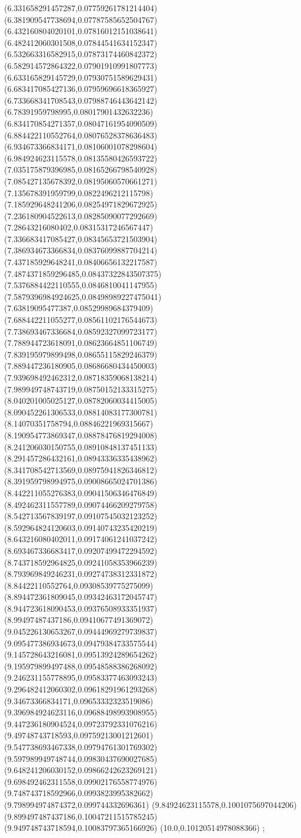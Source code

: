 {(6.331658291457287,0.07759261781214404)
(6.381909547738694,0.07787585652504767)
(6.432160804020101,0.07816012151038641)
(6.482412060301508,0.07844541634152347)
(6.532663316582915,0.07873174460842372)
(6.582914572864322,0.07901910991807773)
(6.633165829145729,0.07930751589629431)
(6.683417085427136,0.07959696618365927)
(6.733668341708543,0.07988746443642142)
(6.78391959798995,0.08017901432632236)
(6.834170854271357,0.08047161954090509)
(6.884422110552764,0.08076528378636483)
(6.934673366834171,0.08106001078298604)
(6.984924623115578,0.08135580426593722)
(7.035175879396985,0.08165266798540928)
(7.085427135678392,0.08195060570661271)
(7.135678391959799,0.0822496212115798)
(7.185929648241206,0.08254971829672925)
(7.236180904522613,0.08285090077292669)
(7.28643216080402,0.08315317246567447)
(7.336683417085427,0.08345653721503904)
(7.386934673366834,0.08376099887704214)
(7.437185929648241,0.08406656132217587)
(7.4874371859296485,0.08437322843507375)
(7.5376884422110555,0.0846810041147955)
(7.5879396984924625,0.08498989227475041)
(7.63819095477387,0.08529989684379409)
(7.688442211055277,0.08561102176544673)
(7.738693467336684,0.08592327099723177)
(7.788944723618091,0.08623664851106749)
(7.839195979899498,0.08655115829246379)
(7.889447236180905,0.08686680434450003)
(7.939698492462312,0.08718359068138214)
(7.989949748743719,0.08750152133315275)
(8.040201005025127,0.08782060034415005)
(8.090452261306533,0.08814083177300781)
(8.14070351758794,0.08846221969315667)
(8.190954773869347,0.08878476819294008)
(8.241206030150755,0.08910848137451133)
(8.291457286432161,0.08943336335438962)
(8.341708542713569,0.08975941826346812)
(8.391959798994975,0.09008665024701386)
(8.442211055276383,0.09041506346476849)
(8.492462311557789,0.09074466209279758)
(8.542713567839197,0.09107545032123252)
(8.592964824120603,0.09140743235420219)
(8.643216080402011,0.09174061241037242)
(8.693467336683417,0.09207499472294592)
(8.743718592964825,0.09241058353966239)
(8.793969849246231,0.09274738312331872)
(8.84422110552764,0.09308539775275099)
(8.894472361809045,0.09342463172045747)
(8.944723618090453,0.09376508933351937)
(8.99497487437186,0.09410677491369072)
(9.045226130653267,0.09444969279739837)
(9.095477386934673,0.09479384733575544)
(9.145728643216081,0.09513924289654262)
(9.195979899497488,0.09548588386268092)
(9.246231155778895,0.09583377463093243)
(9.296482412060302,0.09618291961293268)
(9.34673366834171,0.09653332323519086)
(9.396984924623116,0.09688498993908955)
(9.447236180904524,0.09723792331076216)
(9.49748743718593,0.09759213001212601)
(9.547738693467338,0.09794761301769302)
(9.597989949748744,0.09830437690027685)
(9.648241206030152,0.09866242623269121)
(9.698492462311558,0.09902176558774976)
(9.748743718592966,0.0993823995382662)
(9.798994974874372,0.099744332696361)
(9.84924623115578,0.1001075697044206)
(9.899497487437186,0.10047211515785245)
(9.949748743718594,0.10083797365166926)
(10.0,0.10120514978088366)
};
